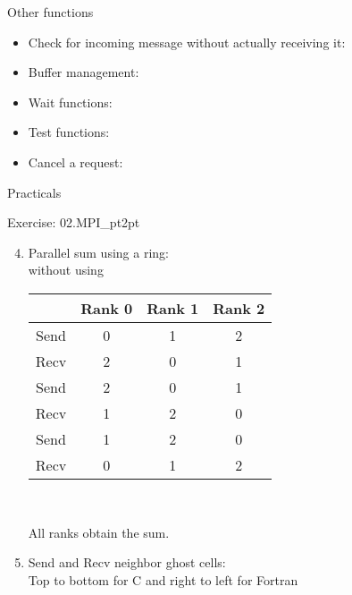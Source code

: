 \documentclass[aspectratio=43]{beamer}
\begin{document}
\begin{frame}[fragile]{Other functions}
\begin{itemize}
\item Check for incoming message without actually receiving it:\\\hspace{1cm}
\item Buffer management:\\\hspace{1cm}
\item Wait functions:\\\hspace{1cm}
\item Test functions:\\\hspace{1cm}
\item Cancel a request:\\\hspace{1cm}
\end{itemize}
\end{frame}

\begin{frame}[fragile]{Practicals}
    \begin{brown2block}{Exercise: 02.MPI\_pt2pt}
    \begin{enumerate}
        \setcounter{enumi}{3}
    \item Parallel sum using a ring:\\
        without using \\
        {{\small
            \begin{tabular}{|c||c|c|c|}\hline
                 & Rank 0 & Rank 1 & Rank 2\\\hline
            Send & 0 & 1 & 2 \\\hline
            Recv & 2 & 0 & 1 \\\hline\hline
            Send & 2 & 0 & 1 \\\hline
            Recv & 1 & 2 & 0 \\\hline\hline
            Send & 1 & 2 & 0 \\\hline
            Recv & 0 & 1 & 2 \\\hline
            \end{tabular}\\}}
        All ranks obtain the sum.
        \item Send and Recv neighbor ghost cells:\\
            Top to bottom for C and right to left for Fortran
    \end{enumerate}
    \end{brown2block}
\end{frame}
\end{document}
